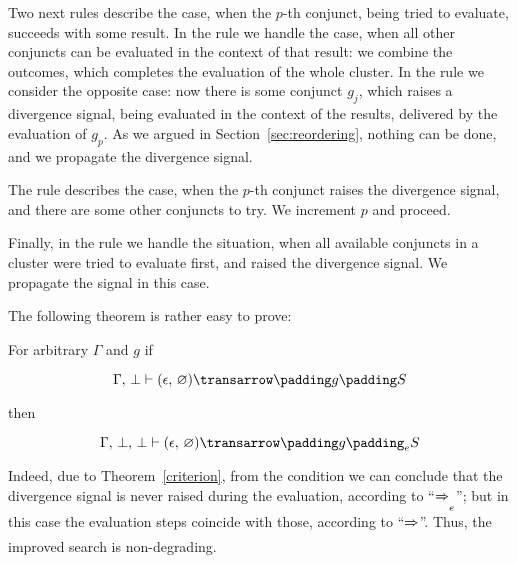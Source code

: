 Two next rules describe the case, when the $p$-th conjunct, being tried to evaluate, succeeds with some result. In the rule
 we handle the case, when all other conjuncts can be evaluated in the context of that result: we
combine the outcomes, which completes the evaluation of the whole cluster. In the rule  we consider
the opposite case: now there is some conjunct $g_j$, which raises a divergence signal, being evaluated in the context of
the results, delivered by the evaluation of $g_p$. As we argued in Section~\ref{sec:reordering}, nothing can be done, and we
propagate the divergence signal.

The rule  describes the case, when the $p$-th conjunct raises the divergence signal, and there are
some other conjuncts to try. We increment $p$ and proceed.

Finally, in the rule  we handle the situation, when all available conjuncts in a cluster were tried to
evaluate first, and raised the divergence signal. We propagate the signal in this case.

The following theorem is rather easy to prove:

\begin{theorem} For arbitrary $\Gamma$ and $g$ if

  \[{\setsubarrow{}\otrans{\Gamma,\,\bot}{(\epsilon,\,\emptyset)}{g}{S}}\]

  then
  
  \[{\setsubarrow{_e}\otrans{\Gamma,\,\bot,\,\bot}{(\epsilon,\,\emptyset)}{g}{S}}\]

\end{theorem}

Indeed, due to Theorem~\ref{criterion}, from the condition we can conclude that the divergence signal is
never raised during the evaluation, according to ``$\xRightarrow{}_e$''; but in this case the evaluation
steps coincide with those, according to ``$\xRightarrow{}$''. Thus, the improved search is non-degrading.





